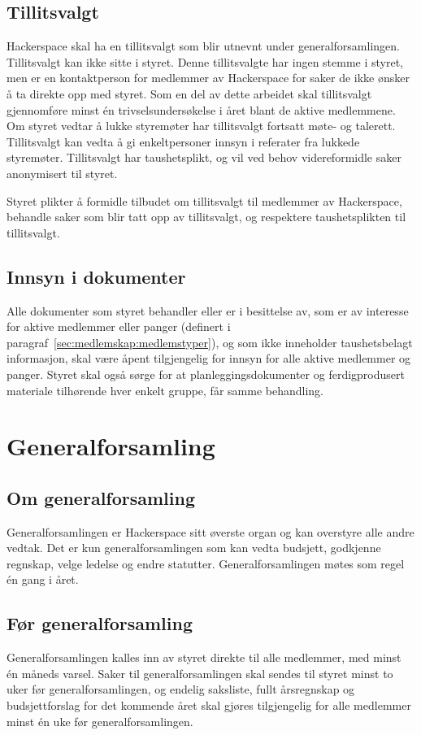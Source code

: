 \subsection{Tillitsvalgt}\label{sec:struktur:tillitsvalgt}
Hackerspace skal ha en tillitsvalgt som blir utnevnt under generalforsamlingen. Tillitsvalgt kan ikke sitte i styret.
Denne tillitsvalgte har ingen stemme i styret, men er en kontaktperson for medlemmer av Hackerspace for saker de ikke ønsker å ta direkte opp med styret.
Som en del av dette arbeidet skal tillitsvalgt gjennomføre minst én trivselsundersøkelse i året blant de aktive medlemmene.
Om styret vedtar å lukke styremøter har tillitsvalgt fortsatt møte- og talerett.
Tillitsvalgt kan vedta å gi enkeltpersoner innsyn i referater fra lukkede styremøter.
Tillitsvalgt har taushetsplikt, og vil ved behov videreformidle saker anonymisert til styret.

Styret plikter å formidle tilbudet om tillitsvalgt til medlemmer av Hackerspace, behandle saker som blir tatt opp av tillitsvalgt, og respektere taushetsplikten til tillitsvalgt.

\subsection{Innsyn i dokumenter}\label{sec:struktur:innsyn}
Alle dokumenter som styret behandler eller er i besittelse av, som er av interesse for aktive medlemmer eller panger (definert i paragraf~\ref{sec:medlemskap:medlemstyper}), og som ikke inneholder taushetsbelagt informasjon, skal være åpent tilgjengelig for innsyn for alle aktive medlemmer og panger.
Styret skal også sørge for at planleggingsdokumenter og ferdigprodusert materiale tilhørende hver enkelt gruppe, får samme behandling.


\section{Generalforsamling}\label{sec:generalforsamling}
\subsection{Om generalforsamling}\label{sec:generalforsamling:om}
Generalforsamlingen er Hackerspace sitt øverste organ og kan overstyre alle andre vedtak.
Det er kun generalforsamlingen som kan vedta budsjett, godkjenne regnskap, velge ledelse og endre statutter.
Generalforsamlingen møtes som regel én gang i året.

\subsection{Før generalforsamling}\label{sec:generalforsamling:før}
Generalforsamlingen kalles inn av styret direkte til alle medlemmer, med minst én måneds varsel.
Saker til generalforsamlingen skal sendes til styret minst to uker før generalforsamlingen, og endelig saksliste, fullt årsregnskap og budsjettforslag for det kommende året skal gjøres tilgjengelig for alle medlemmer minst én uke før generalforsamlingen.

